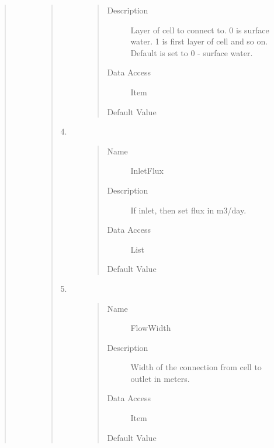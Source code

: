 \documentclass[letterpaper,10pt,english]{sphinxmanual}
\begin{document}
\begin{quote}
\begin{description}
\begin{quote}
\begin{description}
\begin{quote}
\begin{description}
\item[{Description}] \leavevmode
Layer of cell to connect to. 0 is surface water. 1 is first layer of cell and so on.
Default is set to 0 - surface water.

\item[{Data Access}] \leavevmode
Item

\item[{Default Value}] \leavevmode
{}

\end{description}\end{quote}

\item[{4.}] \leavevmode\begin{quote}\begin{description}
\item[{Name}] \leavevmode
InletFlux

\item[{Description}] \leavevmode
If inlet, then set flux in m3/day.

\item[{Data Access}] \leavevmode
List

\item[{Default Value}] \leavevmode
{}

\end{description}\end{quote}

\item[{5.}] \leavevmode\begin{quote}\begin{description}
\item[{Name}] \leavevmode
FlowWidth

\item[{Description}] \leavevmode
Width of the connection from cell to outlet in meters.

\item[{Data Access}] \leavevmode
Item

\item[{Default Value}] \leavevmode
{}


\end{description}
\end{quote}
\end{description}
\end{quote}
\end{description}
\end{quote}
\end{document}
